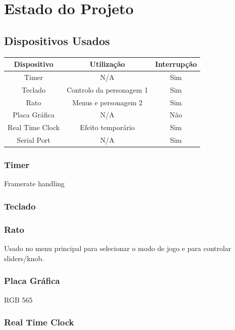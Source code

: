 \documentclass{report}
\begin{document}
\chapter{Estado do Projeto}

\section{Dispositivos Usados}

\begin{center}
	\begin{tabular}{ |c|c|c| } 
		\hline
			Dispositivo & Utilização & Interrupção \\ 
		\hline
		\hline
			Timer & N/A & Sim \\ 
			Teclado & Controlo da personagem 1 & Sim \\ 
			Rato & Menus e personagem 2 & Sim\\
			Placa Gráfica & N/A & Não\\
			Real Time Clock & Efeito temporário & Sim\\
			Serial Port & N/A & Sim \\
		\hline
	\end{tabular}
\end{center}

\subsection{Timer}

Framerate handling

\subsection{Teclado}

\subsection{Rato}

Usado no menu principal para selecionar o modo de jogo e para controlar sliders/knob.

\subsection{Placa Gráfica}

RGB 565

\subsection{Real Time Clock}
\end{document}
